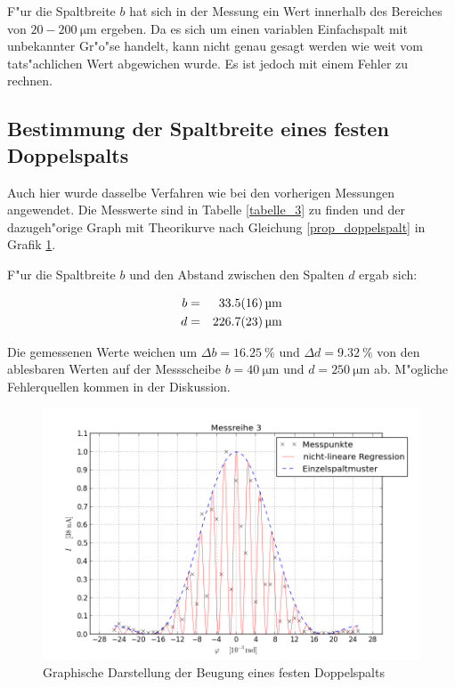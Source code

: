 		F"ur die Spaltbreite $b$ hat sich in der Messung ein Wert innerhalb des Bereiches von $20-200 \SI{}{\micro \meter}$ ergeben. Da es sich um einen variablen Einfachspalt mit unbekannter Gr"o"se handelt, kann nicht genau gesagt werden wie weit vom tats"achlichen Wert abgewichen wurde. Es ist jedoch mit einem Fehler zu rechnen.

\clearpage
		\newpage
		\newpage
	\subsection{Bestimmung der Spaltbreite eines festen Doppelspalts} 
	\label{sub:bestimmung_der_spaltbreite_eines_festen_doppelspalts}
	
		Auch hier wurde dasselbe Verfahren wie bei den vorherigen Messungen angewendet.
		Die Messwerte sind in Tabelle \ref{tabelle_3} zu finden und der dazugeh"orige Graph mit Theorikurve nach Gleichung \eqref{prop_doppelspalt} in Grafik \ref{graph3}.

		F"ur die Spaltbreite $b$ und den Abstand zwischen den Spalten $d$ ergab sich:

		\begin{eqnarray*}
			b &=& \SI{33.5 (16)}{\micro \meter}\\
			d &=& \SI{226.7 (23)}{\micro \meter}
		\end{eqnarray*}

		Die gemessenen Werte weichen um $\Delta b = \SI{16.25}{\percent}$ und $\Delta d = \SI{9.32}{\percent}$ von den ablesbaren Werten auf der Messscheibe $b = \SI{40}{\micro \meter}$ und $d = \SI{250}{\micro \meter}$ ab.
		M"ogliche Fehlerquellen kommen in der Diskussion.

		

		\begin{figure}[H]
			\centering
			\includegraphics[width = 16cm]{graph_3.png}
			\caption{Graphische Darstellung der Beugung eines festen Doppelspalts}
			\label{graph3}
		\end{figure}
		\clearpage
